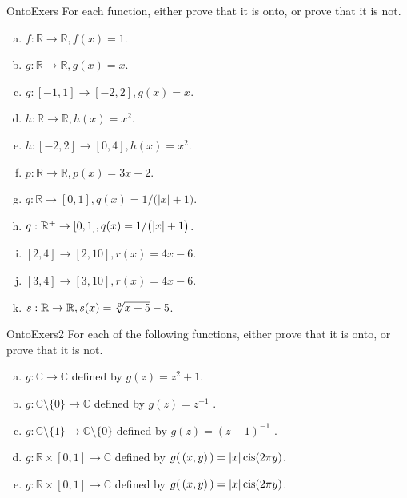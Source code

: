 \begin{exercise}{OntoExers} 
For each function, either prove that it is onto, or prove that it is not.
\begin{multicols}{2}
\begin{enumerate}[(a)]
\item \label{OntoExers-formula-a(x)}
 $f: \mathbb{R} \rightarrow \mathbb{R}, f(x) = 1$.
\item \label{OntoExers-formula-b(x)}
 $g: \mathbb{R} \rightarrow \mathbb{R}, g(x) = x$.
\item \label{OntoExers-formula-b(x)2}
 $g: [-1,1] \rightarrow [-2,2], g(x) = x$.
\item \label{OntoExers-formula-c(x)}
 $h: \mathbb{R} \rightarrow \mathbb{R}, h(x) = x^2$.
\item \label{OntoExers-formula-c(x)2}
 $h: [-2,2] \rightarrow [0,4], h(x) = x^2$.
\item \label{OntoExers-formula-p(x)}
 $p: \mathbb{R} \rightarrow \mathbb{R}, p(x) = 3x + 2$.
\item \label{OntoExers-formula-q(x)}
 $q: \mathbb{R} \rightarrow [0,1], q(x) = 1/ \bigl( |x| + 1 \bigr)$.
\item \label{OntoExers-formula-q(x)2}
 $q: \mathbb{R}^+ \rightarrow [0,1], \\q(x) = 1/ \bigl( |x| + 1 \bigr)$.
\item \label{OntoExers-formula-r(x)}
 $[2,4] \rightarrow [2,10], r(x) = 4x - 6$.
\item \label{OntoExers-formula-r(x)2}
 $[3,4] \rightarrow [3,10], r(x) = 4x - 6$.
\item \label{OntoExers-formula-s(x)}
 $s: \mathbb{R} \rightarrow \mathbb{R}, s(x) = \root 3 \of {x+5} - 5$.
\end{enumerate}
\end{multicols}
\end{exercise}


\begin{exercise}{OntoExers2}
For each of the following  functions, either prove that it is onto, or prove that it is not.
\begin{enumerate}[(a)]
\item
 $g \colon {\mathbb C}  \to {\mathbb C} $ defined by $g(z) =  z^2+1$.
\item
 $g \colon {\mathbb C}\setminus \{0\}  \to {\mathbb C} $ defined by $g(z) =  z^{-1}$ .
\item
 $g \colon {\mathbb C}\setminus \{1\}  \to {\mathbb C}\setminus \{0\} $ defined by $g(z) =  (z-1)^{-1}$ .
\item
 $g \colon {\mathbb R} \times [0,1]  \to {\mathbb C} $ defined by $g(\,(x,y)\,) =  |x| \operatorname{cis} ( 2\pi y)$.
\item
 $g \colon {\mathbb R} \times [0,1]  \to {\mathbb C} $ defined by $g(\,(x,y)\,) =  |x| \operatorname{cis} ( 2\pi y)$.
\end{enumerate}
\end{exercise}


